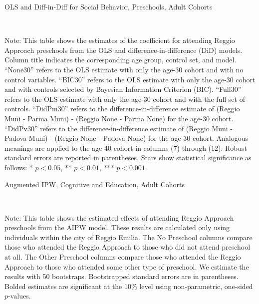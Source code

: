 \begin{landscape}
\begin{table}[H] \caption{OLS and Diff-in-Diff for Social Behavior, Preschools, Adult Cohorts} \label{ols-S-reg}
\scalebox{0.80}{
}
\vspace{1ex} \\
\footnotesize\raggedright{Note: This table shows the estimates of the coefficient for attending Reggio Approach preschools from the OLS and difference-in-difference (DiD) models. Column title indicates the corresponding age group, control set, and model. ``None30'' refers to the OLS estimate with only the age-30 cohort and with no control variables. ``BIC30'' refers to the OLS estimate with only the age-30 cohort and with controls selected by Bayesian Information Criterion (BIC). ``Full30'' refers to the OLS estimate with only the age-30 cohort and with the full set of controls. ``DidPm30'' refers to the difference-in-difference estimate of (Reggio Muni - Parma Muni) - (Reggio None - Parma None) for the age-30 cohort. ``DidPv30'' refers to the difference-in-difference estimate of (Reggio Muni - Padova Muni) - (Reggio None - Padova None) for the age-30 cohort.  Analogous meanings are applied to the age-40 cohort in columns (7) through (12). Robust standard errors are reported in parentheses. Stars show statistical significance as follows: * $p < 0.05$, ** $p < 0.01$, *** $p < 0.001$.}
\end{table}

\begin{table}[H] \caption{Augmented IPW, Cognitive and Education, Adult Cohorts} \label{ipw-adult-E}
	
	\vspace{1ex} \\
\footnotesize\raggedright{Note: This table shows the estimated effects of attending Reggio Approach preschools from the AIPW model. These results are calculated only using individuals within the city of Reggio Emilia. The No Preschool columns compare those who attended the Reggio Approach to those who did not attend preschool at all. The Other Preschool columns compare those who attended the Reggio Approach to those who attended some other type of preschool. We estimate the results with 50 bootstraps. Bootstrapped standard errors are in parentheses. Bolded estimates are significant at the 10\% level using non-parametric, one-sided $p$-values.}
\end{table}


\end{landscape}
